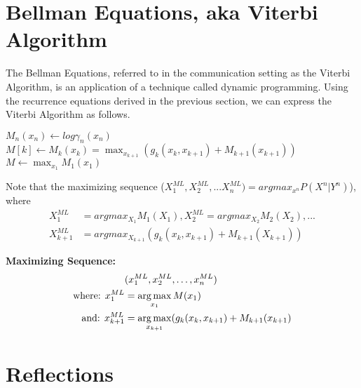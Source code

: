 \documentclass{article}
\begin{document}
	\section{Bellman Equations, aka Viterbi Algorithm}
	
	The Bellman Equations, referred to in the communication setting as the Viterbi Algorithm, is an application of a technique called dynamic programming. Using the recurrence equations derived in the previous section, we can express the Viterbi Algorithm as follows.
	
	\begin{algorithm}
		
		\begin {algorithmic}[1]
		
		\State $M_n(x_n) \gets log \gamma_n(x_n)$ 
		\State $M[k] \gets M_k(x_k) = \max_{x_{k+1}}  (g_k (x_k, x_{k+1}) + M_{k+1}(x_{k+1}))$
		\EndFor
		\State $M \gets \max_{x_1} M_1 (x_1)$ 
		\EndFunction
	\end{algorithmic}
\end{algorithm}

Note that the maximizing sequence ($X_1^{ML}, X_2^{ML}, ... X_n^{ML}) = argmax_{x^n} P(X^n|Y^n)$), where
\begin{align*}
	X_1^{ML} &= argmax_{X_1} M_1(X_1), X_2^{ML} = argmax_{X_2} M_2(X_2), ...\\
	X_{k+1}^{ML} &= argmax_{X_{k+1}}(g_k(x_k, x_{k+1}) + M_{k+1}(X_{k+1}))
\end{align*}


\textbf{Maximizing Sequence:}
\begin{align*}
	&(x_{1}^{ML}, x_{2}^{ML}, \dots , x_{n}^{ML})\\
	\text{where: } x_{1}^{ML} &= \operatorname*{arg\,max}_{x_1} M(x_1)\\
	\text{and: } x_{k+1}^{ML} &= \operatorname*{arg\,max}_{x_{k+1}} ( g_k(x_k, x_{k+1}) + M_{k+1} (x_{k+1})
\end{align*}

\section{Reflections}
\end{document}
